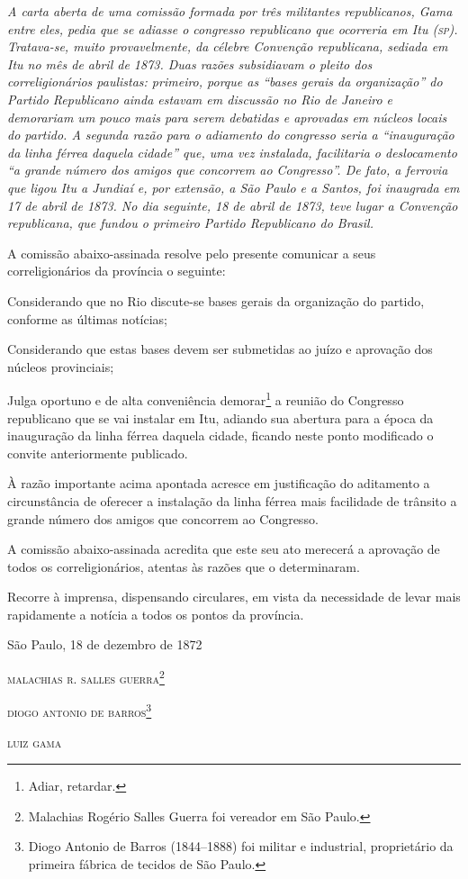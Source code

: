 \begin{didascalia}
\emph{A carta aberta de uma comissão formada por três militantes
republicanos, Gama entre eles, pedia que se adiasse o congresso
republicano que ocorreria em Itu (\textsc{sp}). Tratava-se, muito provavelmente,
da célebre Convenção republicana, sediada em Itu no mês de abril de
1873. Duas razões subsidiavam o pleito dos correligionários paulistas:
primeiro, porque as ``bases gerais da organização'' do Partido Republicano
ainda estavam em discussão no Rio de Janeiro e demorariam um pouco mais
para serem debatidas e aprovadas em núcleos locais do partido. A segunda
razão para o adiamento do congresso seria a ``inauguração da linha férrea
daquela cidade'' que, uma vez instalada, facilitaria o deslocamento ``a
grande número dos amigos que concorrem ao Congresso''. De fato, a
ferrovia que ligou Itu a Jundiaí e, por extensão, a São Paulo e a
Santos, foi inaugrada em 17 de abril de 1873. No dia seguinte, 18 de abril de 1873, teve
lugar a Convenção republicana, que fundou o primeiro Partido Republicano
do Brasil.}
\end{didascalia}


A comissão abaixo-assinada resolve pelo presente comunicar a seus
correligionários da província o seguinte:

Considerando que no Rio discute-se bases gerais da organização do
partido, conforme as últimas notícias;

Considerando que estas bases devem ser submetidas ao juízo e aprovação
dos núcleos provinciais;

Julga oportuno e de alta conveniência demorar\footnote{ Adiar,
  retardar.} a reunião do Congresso republicano que se vai instalar em
Itu, adiando sua abertura para a época da inauguração da linha férrea
daquela cidade, ficando neste ponto modificado o convite anteriormente
publicado.

À razão importante acima apontada acresce em justificação do aditamento
a circunstância de oferecer a instalação da linha férrea mais facilidade
de trânsito a grande número dos amigos que concorrem ao Congresso.

A comissão abaixo-assinada acredita que este seu ato merecerá a
aprovação de todos os correligionários, atentas às razões que o
determinaram.

Recorre à imprensa, dispensando circulares, em vista da necessidade de
levar mais rapidamente a notícia a todos os pontos da província.

\begin{flushright}
São Paulo, 18 de dezembro de 1872

\textsc{malachias r. salles guerra}\footnote{ Malachias Rogério Salles
  Guerra foi vereador em São Paulo.}

\textsc{diogo antonio de barros}\footnote{Diogo Antonio de Barros
  (1844--1888) foi militar e industrial, proprietário da primeira fábrica
  de tecidos de São Paulo.}

\textsc{luiz gama}
\end{flushright}

